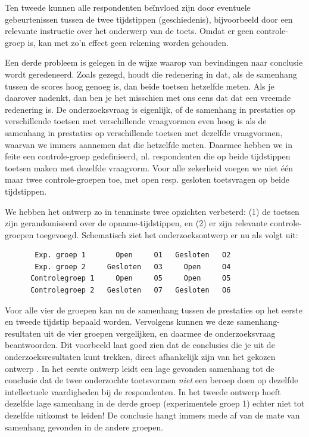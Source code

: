 \documentclass[
]{book}
\begin{document}
Ten tweede kunnen alle respondenten beïnvloed zijn door eventuele
gebeurtenissen tussen de twee tijdstippen (geschiedenis), bijvoorbeeld
door een relevante instructie over het onderwerp van de toets. Omdat er
geen controle-groep is, kan met zo'n effect geen rekening worden
gehouden.

Een derde probleem is gelegen in de wijze waarop van bevindingen naar
conclusie wordt geredeneerd. Zoals gezegd, houdt die redenering in dat,
als de samenhang tussen de scores hoog genoeg is, dan beide toetsen
hetzelfde meten. Als je daarover nadenkt, dan ben je het misschien met
ons eens dat dat een vreemde redenering is. De onderzoeksvraag is
eigenlijk, of de samenhang in prestaties op verschillende toetsen met
verschillende vraagvormen even hoog is als de samenhang in prestaties op
verschillende toetsen met dezelfde vraagvormen, waarvan we immers
aannemen dat die hetzelfde meten. Daarmee hebben we in feite een
controle-groep gedefinieerd, nl. respondenten die op beide tijdstippen
toetsen maken met dezelfde vraagvorm. Voor alle zekerheid voegen we niet
één maar twee controle-groepen toe, met open resp. gesloten toetsvragen
op beide tijdstippen.

We hebben het ontwerp zo in tenminste twee opzichten verbeterd: (1) de
toetsen zijn gerandomiseerd over de opname-tijdstippen, en (2) er zijn
relevante controle-groepen toegevoegd. Schematisch ziet het
onderzoeksontwerp er nu als volgt uit:

\begin{verbatim}
       Exp. groep 1       Open     O1   Gesloten   O2
       Exp. groep 2     Gesloten   O3     Open     O4
      Controlegroep 1     Open     O5     Open     O5
      Controlegroep 2   Gesloten   O7   Gesloten   O6
\end{verbatim}

Voor alle vier de groepen kan nu de samenhang tussen de prestaties op
het eerste en tweede tijdstip bepaald worden. Vervolgens kunnen we deze
samenhang-resultaten uit de vier groepen vergelijken, en daarmee de
onderzoeksvraag beantwoorden. Dit voorbeeld laat goed zien dat de
conclusies die je uit de onderzoeksresultaten kunt trekken, direct
afhankelijk zijn van het gekozen ontwerp \citep{Levin99}. In het eerste
ontwerp leidt een lage gevonden samenhang tot de conclusie dat de twee
onderzochte toetsvormen \emph{niet} een beroep doen op dezelfde intellectuele
vaardigheden bij de respondenten. In het tweede ontwerp hoeft dezelfde
lage samenhang in de derde groep (experimentele groep 1) echter niet tot
dezelfde uitkomst te leiden! De conclusie hangt immers mede af van de
mate van samenhang gevonden in de andere groepen.
\end{document}
